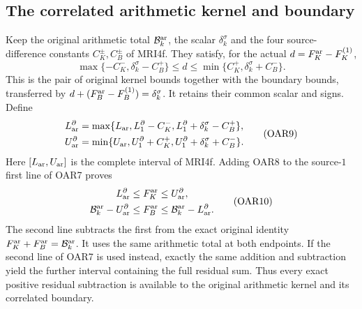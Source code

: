\documentclass[11pt,a4paper]{article}
\begin{document}
\subsection{The correlated arithmetic kernel and boundary}
Keep the original arithmetic total $\mathcal B_k^{\rm ar}$,
the scalar $\delta_k^\sigma$ and the four source-difference constants
$C_K^\pm,C_B^\pm$ of MRI4f. They satisfy, for the actual
$d=F_K^{\rm ar}-F_K^{(1)}$,
\[
 \max\{-C_K^-,\delta_k^\sigma-C_B^+\}\le d
       \le\min\{C_K^+,\delta_k^\sigma+C_B^-\}.
 \tag{OAR8}
\]
This is the pair of original kernel bounds together with the
boundary bounds, transferred by
$d+(F_B^{\rm ar}-F_B^{(1)})=\delta_k^\sigma$.
It retains their common scalar and signs. Define
\[
 \begin{split}
 L_{\rm ar}^{\partial}
   &=\max\{L_{\rm ar},L_1^{\partial}-C_K^-,
                    L_1^{\partial}+\delta_k^\sigma-C_B^+\},\\
 U_{\rm ar}^{\partial}
   &=\min\{U_{\rm ar},U_1^{\partial}+C_K^+,
                    U_1^{\partial}+\delta_k^\sigma+C_B^-\}.
 \end{split}\tag{OAR9}
\]
Here $[L_{\rm ar},U_{\rm ar}]$ is the complete interval of MRI4f.
Adding OAR8 to the source-$1$ first line of OAR7 proves
\[
 \begin{gathered}
 L_{\rm ar}^{\partial}\le F_K^{\rm ar}\le U_{\rm ar}^{\partial},\\
 \mathcal B_k^{\rm ar}-U_{\rm ar}^{\partial}
       \le F_B^{\rm ar}
       \le\mathcal B_k^{\rm ar}-L_{\rm ar}^{\partial}.
 \end{gathered}\tag{OAR10}
\]
The second line subtracts the first from the exact original identity
$F_K^{\rm ar}+F_B^{\rm ar}=\mathcal B_k^{\rm ar}$.
It uses the same arithmetic total at both endpoints. If the second
line of OAR7 is used instead, exactly the same addition and
subtraction yield the further interval containing the full residual
sum. Thus every exact positive residual subtraction is available to
the original arithmetic kernel and its correlated boundary.
\end{document}
